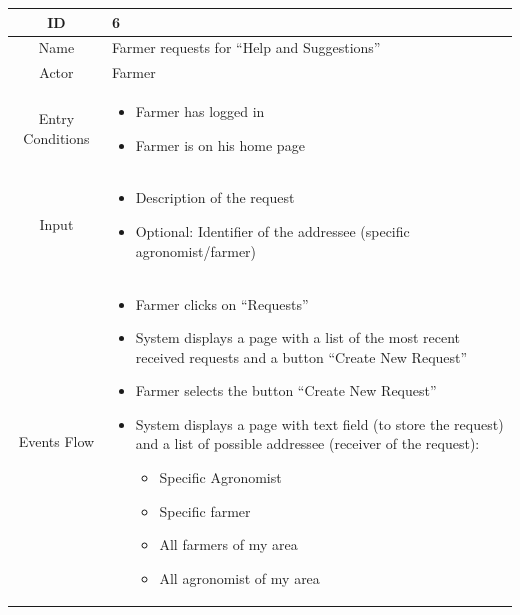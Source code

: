\documentclass{article}
\begin{document}
\begin{center}
    \begin{longtable}{|c| p{10cm}|}
        \hline
            ID & 6 \\
        \hline
            Name & Farmer requests for “Help and Suggestions”  \\
        \hline
            Actor & Farmer \\
        \hline
            Entry Conditions & 
                                \begin{itemize}
                                    \item Farmer has logged in
                                    \item Farmer is on his home page
                                \end{itemize}\\
        \hline
            Input & \begin{itemize}
                        \item Description of the request
                        \item Optional: Identifier of the addressee (specific agronomist/farmer)
                    \end{itemize} \\
        \hline
            Events Flow &   \begin{itemize}
                                \item Farmer clicks on “Requests”
                                \item System displays a page with a list of the most recent received requests and a button “Create New Request”
                                \item Farmer selects the button “Create New Request”
                                \item System displays a page with text field (to store the request) and a list of possible addressee (receiver of the request): 
                                        \begin{itemize}
                                            \item Specific Agronomist
                                            \item Specific farmer
                                            \item All farmers of my area
                                            \item All agronomist of my area
                                        \end{itemize}


\end{itemize}
\end{longtable}
\end{center}
\end{document}
